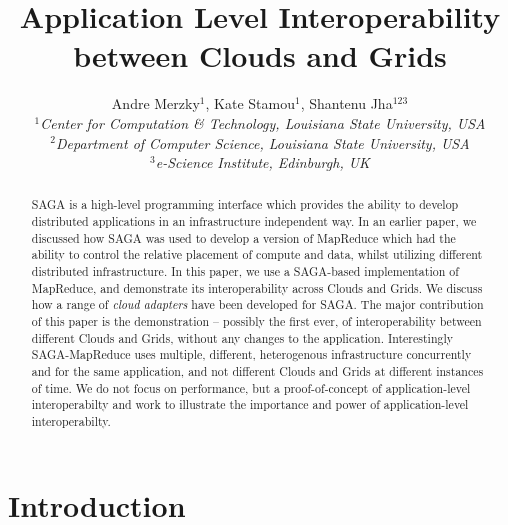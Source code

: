 \documentclass[conference,final]{IEEEtran}
\title{Application Level Interoperability between Clouds and Grids}
\author{Andre Merzky$^{1}$,  Kate Stamou$^{1}$, Shantenu Jha$^{123}$\\
  \small{\emph{$^{1}$Center for Computation \& Technology, Louisiana
      State University, USA}}\\
  \small{\emph{$^{2}$Department of Computer Science, Louisiana State
      University, USA}}\\
  \small{\emph{$^{3}$e-Science Institute, Edinburgh, UK}}\\
}
\newcommand{\jhanote}[1]{ {\textcolor{red} { ***SJ: #1 }}}
\newcommand{\jhanote}[1]{}
\newcommand{\sagamapreduce }{SAGA-MapReduce }
\begin{document}
\maketitle

\begin{abstract}

  SAGA is a high-level programming interface which provides the
  ability to develop distributed applications in an infrastructure
  independent way. In an earlier paper, we discussed how SAGA was used
  to develop a version of MapReduce which
  had the ability to control the relative placement
  of compute and data,  whilst utilizing different distributed
  infrastructure. In this paper, we use a SAGA-based implementation of
  MapReduce, and demonstrate its interoperability across Clouds and
  Grids.  We discuss how a range of {\it cloud adapters} have been
  developed for SAGA.  The major contribution of this paper is the
  demonstration -- possibly the first ever, of interoperability
  between different Clouds and Grids, without any changes to the
  application. Interestingly \sagamapreduce uses multiple, different,
  heterogenous infrastructure concurrently and for the same
  application, and not different Clouds and Grids at different
  instances of time.  We do not focus on performance, but a
  proof-of-concept of application-level interoperabilty and work to
  illustrate the importance and power of application-level
  interoperabilty.
\end{abstract}

\section{Introduction} 



\end{document}
